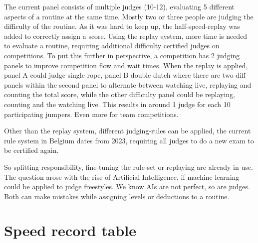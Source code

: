 The current panel consists of multiple judges (10-12), evaluating 5 different aspects of a routine at the same time. Mostly two or three people are judging the difficulty of the routine. As it was hard to keep up, the half-speed-replay was added to correctly assign a score.
Using the replay system, more time is needed to evaluate a routine, requiring additional difficulty certified judges on competitions. To put this further in perspective, a competition has 2 judging panels to improve competition flow and wait times. When the replay is applied, panel A could judge single rope, panel B double dutch where there are two diff panels within the second panel to alternate between watching live, replaying and counting the total score, while the other difficulty panel could be replaying, counting and the watching live. This results in around 1 judge for each 10 participating jumpers. Even more for team competitions.

Other than the replay system, different judging-rules can be applied, the current rule system in Belgium dates from 2023, requiring all judges to do a new exam to be certified again.

So splitting responsibility, fine-tuning the rule-set or replaying are already in use. The question arose with the rise of Artificial Intelligence, if machine learning could be applied to judge freestyles. We know AIs are not perfect, so are judges. Both can make mistakes while assigning levels or deductions to a routine.

\section{Speed record table}





